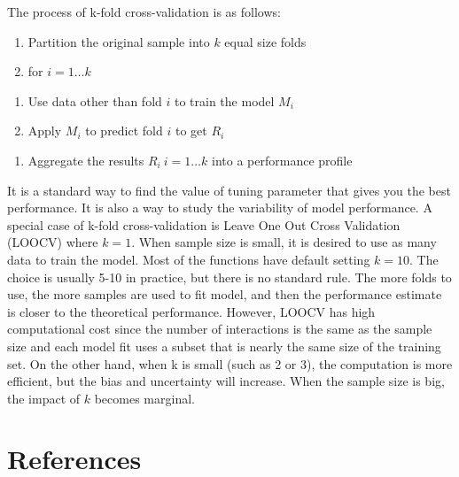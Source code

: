 \documentclass[12pt,]{krantz}
\providecommand{\tightlist}{%
  \setlength{\itemsep}{0pt}\setlength{\parskip}{0pt}}
\renewenvironment{quote}{\begin{VF}}{\end{VF}}
\theoremstyle{definition}
\theoremstyle{definition}
\theoremstyle{remark}
\begin{document}
The process of k-fold cross-validation is as follows:

\begin{quote}
\begin{enumerate}
\def\labelenumi{\arabic{enumi}.}
\tightlist
\item
  Partition the original sample into \(k\) equal size folds
\item
  for \(i=1…k\)
\end{enumerate}

\begin{enumerate}
\def\labelenumi{\alph{enumi}.}
\tightlist
\item
  Use data other than fold \(i\) to train the model \(M_{i}\)
\item
  Apply \(M_{i}\) to predict fold \(i\) to get \(R_{i}\)
\end{enumerate}

\begin{enumerate}
\def\labelenumi{\arabic{enumi}.}
\setcounter{enumi}{2}
\tightlist
\item
  Aggregate the results \(R_{i}\ i=1\dots k\) into a performance profile
\end{enumerate}
\end{quote}

It is a standard way to find the value of tuning parameter that gives
you the best performance. It is also a way to study the variability of
model performance. A special case of k-fold cross-validation is Leave
One Out Cross Validation (LOOCV) where \(k=1\). When sample size is
small, it is desired to use as many data to train the model. Most of the
functions have default setting \(k=10\). The choice is usually 5-10 in
practice, but there is no standard rule. The more folds to use, the more
samples are used to fit model, and then the performance estimate is
closer to the theoretical performance. However, LOOCV has high
computational cost since the number of interactions is the same as the
sample size and each model fit uses a subset that is nearly the same
size of the training set. On the other hand, when k is small (such as 2
or 3), the computation is more efficient, but the bias and uncertainty
will increase. When the sample size is big, the impact of \(k\) becomes
marginal.

\chapter{References}\label{references}



\backmatter
\printindex
\end{document}
